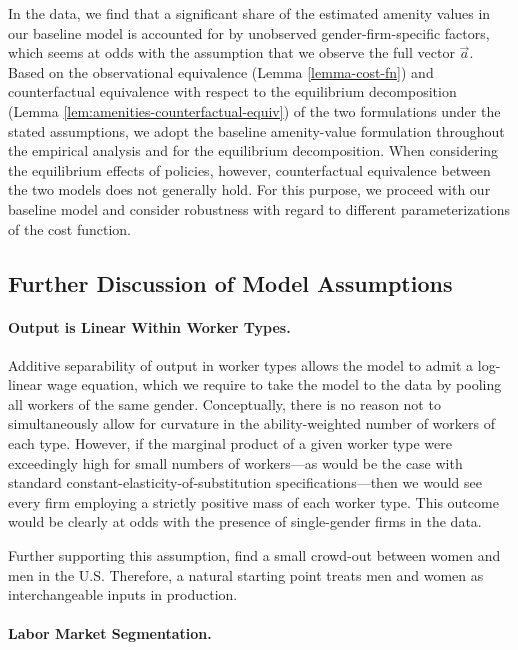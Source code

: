 In the data, we find that a significant share of the estimated amenity values in our baseline model is accounted for by unobserved gender-firm-specific factors, which seems at odds with the assumption that we observe the full vector $\vec{a}$. Based on the observational equivalence (Lemma \ref{lemma-cost-fn}) and counterfactual equivalence with respect to the equilibrium decomposition (Lemma \ref{lem:amenities-counterfactual-equiv}) of the two formulations under the stated assumptions, we adopt the baseline amenity-value formulation throughout the empirical analysis and for the equilibrium decomposition. When considering the equilibrium effects of policies, however, counterfactual equivalence between the two models does not generally hold. For this purpose, we proceed with our baseline model and consider robustness with regard to different parameterizations of the cost function.


\subsection{Further Discussion of Model Assumptions\label{app:assumptions_discussion}}

\paragraph{Output is Linear Within Worker Types.}

Additive separability of output in worker types allows the model to admit a log-linear wage equation, which we require to take the model to the data by pooling all workers of the same gender. Conceptually, there is no reason not to simultaneously allow for curvature in the ability-weighted number of workers of each type. However, if the marginal product of a given worker type were exceedingly high for small numbers of workers---as would be the case with standard constant-elasticity-of-substitution specifications---then we would see every firm employing a strictly positive mass of each worker type. This outcome would be clearly at odds with the presence of single-gender firms in the data.

Further supporting this assumption, \citet{FukuiNakamuraSteinsson2023} find a small crowd-out between women and men in the U.S. Therefore, a natural starting point treats men and women as interchangeable inputs in production.


\paragraph{Labor Market Segmentation.}

